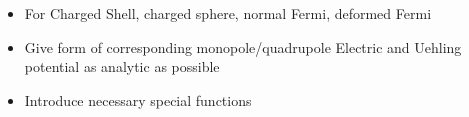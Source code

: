 
\begin{itemize}
\item For Charged Shell, charged sphere, normal Fermi, deformed Fermi
\item Give form of corresponding monopole/quadrupole Electric and Uehling potential as analytic as possible
\item Introduce necessary special functions
\end{itemize}
